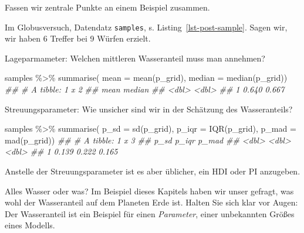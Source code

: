 \documentclass[
  a4paper,
  DIV=11]{scrreprt}
\newenvironment{Shaded}{\begin{snugshade}}{\end{snugshade}}
\newcommand{\AttributeTok}[1]{\textcolor[rgb]{0.40,0.45,0.13}{#1}}
\newcommand{\DocumentationTok}[1]{\textcolor[rgb]{0.37,0.37,0.37}{\textit{#1}}}
\newcommand{\FunctionTok}[1]{\textcolor[rgb]{0.28,0.35,0.67}{#1}}
\newcommand{\NormalTok}[1]{\textcolor[rgb]{0.00,0.23,0.31}{#1}}
\newcommand{\SpecialCharTok}[1]{\textcolor[rgb]{0.37,0.37,0.37}{#1}}
\theoremstyle{definition}
\theoremstyle{remark}
\begin{document}
Fassen wir zentrale Punkte an einem Beispiel zusammen.

Im Globusversuch, Datendatz \texttt{samples}, s.
Listing~\ref{lst-post-sample}. Sagen wir, wir haben 6 Treffer bei 9
Würfen erzielt.

Lageparmameter: Welchen mittleren Wasseranteil muss man annehmen?

\begin{Shaded}
\begin{Highlighting}[]
\NormalTok{samples }\SpecialCharTok{\%\textgreater{}\%} 
  \FunctionTok{summarise}\NormalTok{(}
    \AttributeTok{mean   =} \FunctionTok{mean}\NormalTok{(p\_grid),}
    \AttributeTok{median =} \FunctionTok{median}\NormalTok{(p\_grid))  }
\DocumentationTok{\#\# \# A tibble: 1 x 2}
\DocumentationTok{\#\#    mean median}
\DocumentationTok{\#\#   \textless{}dbl\textgreater{}  \textless{}dbl\textgreater{}}
\DocumentationTok{\#\# 1 0.640  0.667}
\end{Highlighting}
\end{Shaded}

Streuungsparameter: Wie unsicher sind wir in der Schätzung des
Wasseranteils?

\begin{Shaded}
\begin{Highlighting}[]
\NormalTok{samples }\SpecialCharTok{\%\textgreater{}\%} 
  \FunctionTok{summarise}\NormalTok{(}
    \AttributeTok{p\_sd   =} \FunctionTok{sd}\NormalTok{(p\_grid),}
    \AttributeTok{p\_iqr =} \FunctionTok{IQR}\NormalTok{(p\_grid),}
    \AttributeTok{p\_mad =} \FunctionTok{mad}\NormalTok{(p\_grid))  }
\DocumentationTok{\#\# \# A tibble: 1 x 3}
\DocumentationTok{\#\#    p\_sd p\_iqr p\_mad}
\DocumentationTok{\#\#   \textless{}dbl\textgreater{} \textless{}dbl\textgreater{} \textless{}dbl\textgreater{}}
\DocumentationTok{\#\# 1 0.139 0.222 0.165}
\end{Highlighting}
\end{Shaded}

Anstelle der Streuungsparameter ist es aber üblicher, ein HDI oder PI
anzugeben.

\begin{tcolorbox}[enhanced jigsaw, colframe=quarto-callout-important-color-frame, title=\textcolor{quarto-callout-important-color}{\faExclamation}\hspace{0.5em}{Wichtig}, breakable, leftrule=.75mm, coltitle=black, toptitle=1mm, bottomrule=.15mm, bottomtitle=1mm, opacityback=0, arc=.35mm, rightrule=.15mm, left=2mm, colbacktitle=quarto-callout-important-color!10!white, opacitybacktitle=0.6, toprule=.15mm, titlerule=0mm, colback=white]
Alles Wasser oder was? Im Beispiel dieses Kapitels haben wir unser
gefragt, was wohl der Wasseranteil auf dem Planeten Erde ist. Halten Sie
sich klar vor Augen: Der Wasseranteil ist ein Beispiel für einen
\emph{Parameter}, einer unbekannten Größes eines Modells.
\end{tcolorbox}
\end{document}

